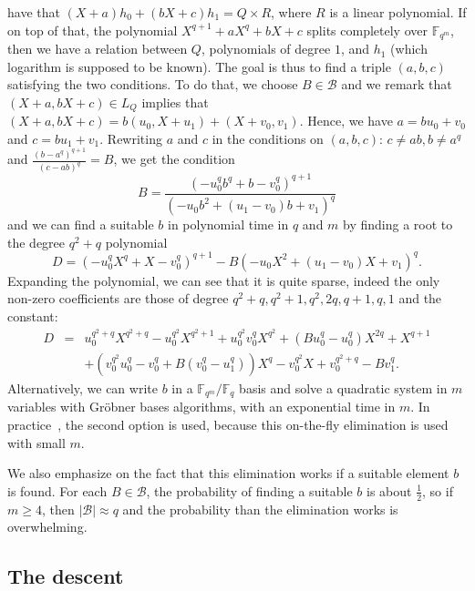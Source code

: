 \documentclass[a4paper,11pt]{article}
\theoremstyle{break}
\theoremstyle{sc}
\theoremstyle{definition}
\theoremstyle{remark}
\begin{document}
have that $(X+a)h_0+(bX+c)h_1=Q\times R$, where $R$ is a linear polynomial. If
on top of that, the polynomial $X^{q+1}+aX^q+bX+c$ splits completely over
$\mathbb{F}_{q^m}$, then we have a relation between $Q$, polynomials of degree
$1$, and $h_1$ (which logarithm is supposed to be known). The goal is thus to
find a triple $(a, b, c)$ satisfying the two conditions. To do that, we choose
$B\in \mathcal B$ and we remark that $(X+a,
bX+c)\in L_Q$ implies that $(X+a, bX+c)=b(u_0, X+u_1)+(X+v_0, v_1)$. Hence, we
have $a=bu_0+v_0$ and $c=bu_1+v_1$. Rewriting $a$ and $c$ in the conditions
on $(a,b,c)$: $c\neq ab,b\neq a^q$ and $\frac{(b-a^q)^{q+1}}{(c-ab)^q}=B$, we
get the condition
\[
  B = \frac{(-u_0^qb^q+b-v_0^q)^{q+1}}{(-u_0b^2+(u_1-v_0)b+v_1)^q}
\]
and we can find a suitable $b$ in polynomial time in $q$ and $m$ by finding a
root to the degree
$q^2+q$ polynomial
\[
  D = (-u_0^qX^q+X-v_0^q)^{q+1} - B(-u_0X^2+(u_1-v_0)X+v_1)^q.
\]
Expanding the polynomial, we can see that it is quite sparse, indeed the only
non-zero coefficients are those of degree $q^2+q, q^2+1, q^2, 2q, q+1, q, 1$ and
the constant:
\begin{eqnarray*}
  D &=&
  u_0^{q^2+q}X^{q^2+q}-u_0^{q^2}X^{q^2+1}+u_0^{q^2}v_0^qX^{q^2}+(Bu_0^q-u_0^q)X^{2q}+X^{q+1} \\
  & & +(v_0^{q^2}u_0^q-v_0^q+B(v_0^q-u_1^q))X^q-v_0^{q^2}X+v_0^{q^2+q}-Bv_1^q.
\end{eqnarray*}
Alternatively, we can write $b$ in a $\mathbb{F}_{q^m}/\mathbb{F}_q$
basis and solve a quadratic system in $m$ variables with Gröbner bases
algorithms, with an exponential time in $m$. In practice~\cite{Adj16}, the
second option is used, because this on-the-fly elimination is used with small $m$.

We also emphasize on the fact that this elimination works if a suitable element
$b$ is found. For each $B\in\mathcal B$, the probability of finding a suitable
$b$ is about $\frac{1}{2}$, so if
$m\geq4$, then $|\mathcal B|\approx q$ and the probability than the
elimination works is overwhelming.

\subsection{The descent}
\end{document}
